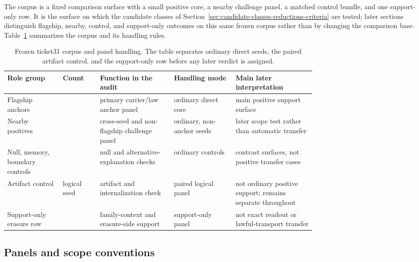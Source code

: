 \documentclass[11pt]{article}
\theoremstyle{definition}
\begin{document}
The corpus is a fixed comparison surface with a small positive core, a nearby challenge
panel, a matched control bundle, and one support-only row. It is the surface on which
the candidate classes of Section~\ref{sec:candidate-classes-reductions-criteria} are
tested; later sections distinguish flagship, nearby, control, and support-only
outcomes on this same frozen corpus rather than by changing the comparison base.
Table~\ref{tab:ticket31-corpus-overview} summarizes the corpus and its handling rules.

\begin{table}[t]
\centering
\small
\caption{Frozen ticket31 corpus and panel handling. The table separates ordinary direct
seeds, the paired artifact control, and the support-only row before any later verdict is
assigned.}
\label{tab:ticket31-corpus-overview}
\begin{tabularx}{\linewidth}{@{}>{\raggedright\arraybackslash}p{0.18\linewidth}>{\raggedright\arraybackslash}p{0.12\linewidth}>{\raggedright\arraybackslash}p{0.24\linewidth}>{\raggedright\arraybackslash}p{0.20\linewidth}>{\raggedright\arraybackslash}X@{}}
\toprule
Role group & Count & Function in the audit & Handling mode & Main later interpretation \\
\midrule
Flagship anchors & 2 & primary carrier/law anchor panel & ordinary direct core & main positive support surface \\
Nearby positives & 4 & cross-seed and non-flagship challenge panel & ordinary, non-anchor seeds & later scope test rather than automatic transfer \\
Null, memory, boundary controls & 3 & null and alternative-explanation checks & ordinary controls & contrast surfaces, not positive transfer cases \\
Artifact control & 1 logical seed & artifact and internalization check & paired logical panel & not ordinary positive support; remains separate throughout \\
Support-only erasure row & 1 & family-context and erasure-side support & support-only panel & not exact readout or lawful-transport transfer \\
\bottomrule
\end{tabularx}
\end{table}

\subsection{Panels and scope conventions}
\end{document}
